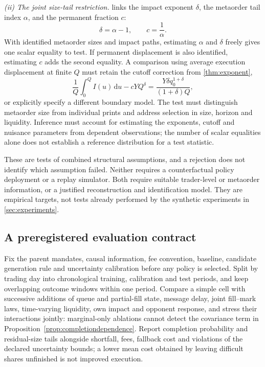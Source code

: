 \documentclass[11pt]{article}
\numberwithin{equation}{section}
\theoremstyle{definition}
\theoremstyle{remark}
\theoremstyle{definition}
\newcommand{\dd}{\,\mathrm d}
\begin{document}
\emph{(ii) The joint size-tail restriction.}  links the
impact exponent $\delta$, the metaorder tail index $\alpha$, and the
permanent fraction $c$:
\[
 \delta=\alpha-1,\qquad c=\frac1\alpha.
\]
With identified metaorder sizes and impact paths, estimating $\alpha$ and
$\delta$ freely gives one scalar equality to test. If permanent displacement
is also identified, estimating $c$ adds the second equality.
A comparison using average execution displacement at finite $Q$ must retain
the cutoff correction from \cref{thm:exponent},
\[
 \frac1Q\int_0^Q I(u)\dd u-cYQ^\delta
 =\frac{Y\delta q_0^{1+\delta}}{(1+\delta)Q},
\]
or explicitly specify a different boundary model. The test must distinguish
metaorder size from individual prints and address selection in size, horizon
and liquidity. Inference must account for estimating the exponents, cutoff
and nuisance parameters from dependent observations; the number of scalar
equalities alone does not establish a reference distribution for a test
statistic.

These are tests of combined structural assumptions, and a rejection does not
identify which assumption failed. Neither requires a counterfactual policy
deployment or a replay simulator. Both require suitable trader-level or
metaorder information, or a justified reconstruction and identification model.
They are empirical targets, not tests already performed by the synthetic
experiments in \cref{sec:experiments}.

\clearpage
\subsection{A preregistered evaluation contract}\label{sec:contract}
Fix the parent mandates, causal information, fee convention, baseline, candidate
generation rule and uncertainty calibration before any policy is selected.
Split by trading day into chronological training, calibration and test
periods, and keep overlapping outcome windows within one period. Compare a
simple cell with successive additions of queue and partial-fill state, message
delay, joint fill--mark laws, time-varying liquidity, own impact and opponent
response, and stress their interactions jointly: marginal-only ablations
cannot detect the covariance term in Proposition~\ref{prop:completiondependence}. Report
completion probability and residual-size tails alongside shortfall, fees,
fallback cost and violations of the declared uncertainty bounds; a lower mean
cost obtained by leaving difficult shares unfinished is not improved execution.
\end{document}
